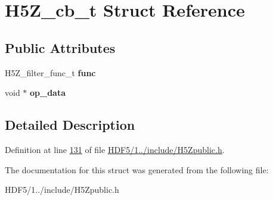 \hypertarget{struct_h5_z__cb__t}{}\section{H5\+Z\+\_\+cb\+\_\+t Struct Reference}
\label{struct_h5_z__cb__t}
\subsection*{Public Attributes}
\begin{DoxyCompactItemize}
\item 
\mbox{\label{struct_h5_z__cb__t_a3bf607f351aa7a5e2a5c547d538294ae}} 
H5\+Z\+\_\+filter\+\_\+func\+\_\+t {\bfseries func}
\item 
\mbox{\label{struct_h5_z__cb__t_aa845f9cb59c305654cdf778cb56147d7}} 
void $\ast$ {\bfseries op\+\_\+data}
\end{DoxyCompactItemize}


\subsection{Detailed Description}


Definition at line \hyperlink{_h_d_f5_21_810_81_2include_2_h5_zpublic_8h_source_l00131}{131} of file \hyperlink{_h_d_f5_21_810_81_2include_2_h5_zpublic_8h_source}{H\+D\+F5/1../include/\+H5\+Zpublic.\+h}.



The documentation for this struct was generated from the following file\+:\begin{DoxyCompactItemize}
\item 
H\+D\+F5/1../include/\+H5\+Zpublic.\+h\end{DoxyCompactItemize}
